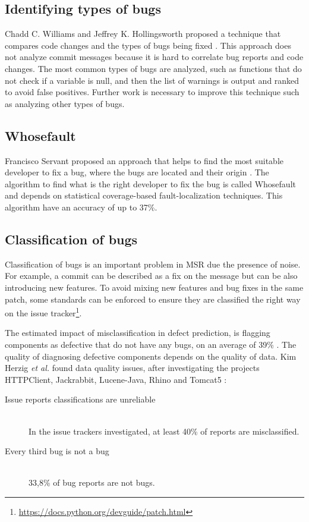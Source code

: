 \subsection{Identifying types of bugs}
Chadd C. Williams and Jeffrey K. Hollingsworth proposed a technique that compares code changes and the types of bugs being fixed \cite{ChaddC.WilliamsandJeffreyK.Hollingsworth2005}. This approach does not analyze commit messages because it is hard to correlate bug reports and code changes. The most common types of bugs are analyzed, such as functions that do not check if a variable is null, and then the list of warnings is output and ranked to avoid false positives. Further work is necessary to improve this technique such as analyzing other types of bugs.

\subsection{Whosefault}
Francisco Servant proposed an approach that helps to find the most suitable developer to fix a bug, where the bugs are located and their origin \cite{Servant1}. The algorithm to find what is the right developer to fix the bug is called Whosefault and depends on statistical coverage-based fault-localization techniques. This algorithm have an accuracy of up to 37\%.

\subsection{Classification of bugs}
Classification of bugs is an important problem in MSR due the presence of noise. For example, a commit can be described as a fix on the message but can be also introducing new features. To avoid mixing new features and bug fixes in the same patch, some standards can be enforced to ensure they are classified the right way on the issue tracker\footnote{\url{https://docs.python.org/devguide/patch.html}}.

The estimated impact of misclassification in defect prediction, is flagging components as defective that do not have any bugs, on an average of 39\% \cite{herzig-tr-2012}. The quality of diagnosing defective components depends on the quality of data. Kim Herzig \textit{et al.} found data quality issues, after investigating the projects HTTPClient, Jackrabbit, Lucene-Java, Rhino and Tomcat5 \cite{herzig-tr-2012}:
\begin{description}
\item[Issue reports classifications are unreliable] \hfill \\
In the issue trackers investigated, at least 40\% of reports are misclassified.
\item[Every third bug is not a bug] \hfill \\
33,8\% of bug reports are not bugs.
\end{description}

